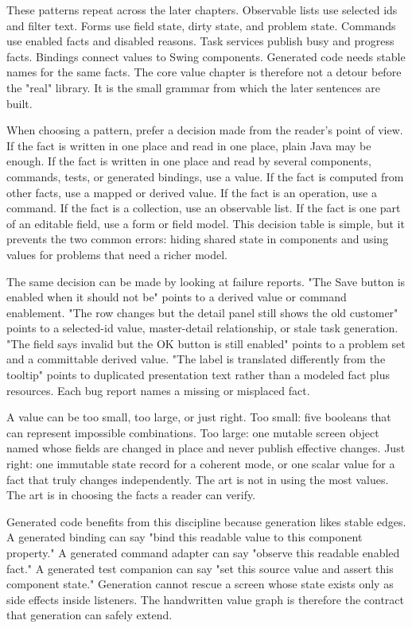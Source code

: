 These patterns repeat across the later chapters. Observable lists use selected
ids and filter text. Forms use field state, dirty state, and problem state.
Commands use enabled facts and disabled reasons. Task services publish busy and
progress facts. Bindings connect values to Swing components. Generated code
needs stable names for the same facts. The core value chapter is therefore not a
detour before the "real" library. It is the small grammar from which the later
sentences are built.

When choosing a pattern, prefer a decision made from the reader's point of view.
If the fact is written in one place and read in one place, plain Java may be
enough. If the fact is written in one place and read by several components,
commands, tests, or generated bindings, use a value. If the fact is computed
from other facts, use a mapped or derived value. If the fact is an operation,
use a command. If the fact is a collection, use an observable list. If the fact
is one part of an editable field, use a form or field model. This decision table
is simple, but it prevents the two common errors: hiding shared state in
components and using values for problems that need a richer model.

The same decision can be made by looking at failure reports. "The Save button is
enabled when it should not be" points to a derived value or command enablement.
"The row changes but the detail panel still shows the old customer" points to a
selected-id value, master-detail relationship, or stale task generation. "The
field says invalid but the OK button is still enabled" points to a problem set
and a committable derived value. "The label is translated differently from the
tooltip" points to duplicated presentation text rather than a modeled fact plus
resources. Each bug report names a missing or misplaced fact.

A value can be too small, too large, or just right. Too small: five booleans that
can represent impossible combinations. Too large: one mutable screen object
named  whose fields are changed in place and never publish effective
changes. Just right: one immutable state record for a coherent mode, or one
scalar value for a fact that truly changes independently. The art is not in
using the most values. The art is in choosing the facts a reader can verify.

Generated code benefits from this discipline because generation likes stable
edges. A generated binding can say "bind this readable value to this component
property." A generated command adapter can say "observe this readable enabled
fact." A generated test companion can say "set this source value and assert this
component state." Generation cannot rescue a screen whose state exists only as
side effects inside listeners. The handwritten value graph is therefore the
contract that generation can safely extend.

